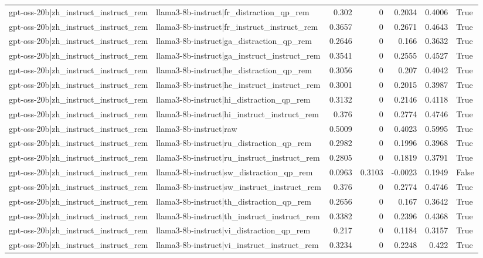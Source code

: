 \begin{table}
\begin{tabular}{l l r r r r l}
gpt-oss-20b|zh_instruct_instruct_rem & llama3-8b-instruct|fr_distraction_qp_rem & 0.302 & 0 & 0.2034 & 0.4006 & True \\
gpt-oss-20b|zh_instruct_instruct_rem & llama3-8b-instruct|fr_instruct_instruct_rem & 0.3657 & 0 & 0.2671 & 0.4643 & True \\
gpt-oss-20b|zh_instruct_instruct_rem & llama3-8b-instruct|ga_distraction_qp_rem & 0.2646 & 0 & 0.166 & 0.3632 & True \\
gpt-oss-20b|zh_instruct_instruct_rem & llama3-8b-instruct|ga_instruct_instruct_rem & 0.3541 & 0 & 0.2555 & 0.4527 & True \\
gpt-oss-20b|zh_instruct_instruct_rem & llama3-8b-instruct|he_distraction_qp_rem & 0.3056 & 0 & 0.207 & 0.4042 & True \\
gpt-oss-20b|zh_instruct_instruct_rem & llama3-8b-instruct|he_instruct_instruct_rem & 0.3001 & 0 & 0.2015 & 0.3987 & True \\
gpt-oss-20b|zh_instruct_instruct_rem & llama3-8b-instruct|hi_distraction_qp_rem & 0.3132 & 0 & 0.2146 & 0.4118 & True \\
gpt-oss-20b|zh_instruct_instruct_rem & llama3-8b-instruct|hi_instruct_instruct_rem & 0.376 & 0 & 0.2774 & 0.4746 & True \\
gpt-oss-20b|zh_instruct_instruct_rem & llama3-8b-instruct|raw & 0.5009 & 0 & 0.4023 & 0.5995 & True \\
gpt-oss-20b|zh_instruct_instruct_rem & llama3-8b-instruct|ru_distraction_qp_rem & 0.2982 & 0 & 0.1996 & 0.3968 & True \\
gpt-oss-20b|zh_instruct_instruct_rem & llama3-8b-instruct|ru_instruct_instruct_rem & 0.2805 & 0 & 0.1819 & 0.3791 & True \\
gpt-oss-20b|zh_instruct_instruct_rem & llama3-8b-instruct|sw_distraction_qp_rem & 0.0963 & 0.3103 & -0.0023 & 0.1949 & False \\
gpt-oss-20b|zh_instruct_instruct_rem & llama3-8b-instruct|sw_instruct_instruct_rem & 0.376 & 0 & 0.2774 & 0.4746 & True \\
gpt-oss-20b|zh_instruct_instruct_rem & llama3-8b-instruct|th_distraction_qp_rem & 0.2656 & 0 & 0.167 & 0.3642 & True \\
gpt-oss-20b|zh_instruct_instruct_rem & llama3-8b-instruct|th_instruct_instruct_rem & 0.3382 & 0 & 0.2396 & 0.4368 & True \\
gpt-oss-20b|zh_instruct_instruct_rem & llama3-8b-instruct|vi_distraction_qp_rem & 0.217 & 0 & 0.1184 & 0.3157 & True \\
gpt-oss-20b|zh_instruct_instruct_rem & llama3-8b-instruct|vi_instruct_instruct_rem & 0.3234 & 0 & 0.2248 & 0.422 & True \\

\end{tabular}
\end{table}
